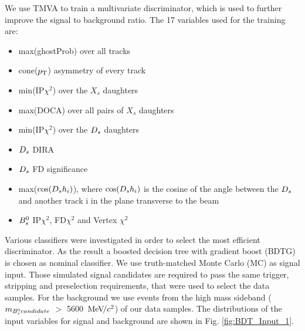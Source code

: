 We use TMVA \cite{Hocker:2007ht} to train a multivariate discriminator, which is used to further improve the signal to background ratio. 
The 17 variables used for the training are:

\begin{itemize} 

\item max(ghostProb) over all tracks

\item cone($\mbox{$p_{\mathrm{ T}}$}$) asymmetry of every track

\item min(IP$\chi^{2}$) over the $X_{s}$ daughters

\item max(DOCA) over all pairs of $X_{s}$ daughters

\item min(IP$\chi^{2}$) over the ${{D}_{s}}$ daughters

\item ${{D}_{s}}$ DIRA

\item ${{D}_{s}}$ FD significance

\item max($\cos({{D}_{s}} h_{i})$), where $\cos({{D}_{s}} h_{i})$ is the cosine of the angle between the ${{D}_{s}}$ and another track i in the plane transverse to the beam

\item ${{B}^0_{s}}$ IP$\chi^{2}$, FD$\chi^{2}$ and Vertex $\chi^{2}$

\end{itemize}

Various classifiers were investigated in order to select the most efficient discriminator. As the result a boosted decision tree with gradient boost (BDTG) is chosen as nominal classifier. 
We use truth-matched Monte Carlo (MC)
as signal input. 
Those simulated signal candidates are required to pass the same trigger, stripping and preselection requirements, that were used to select the data samples. 
For the background we use events from the high mass sideband ($m_{{{B}^0_{s}} candidate}$ $>$ 5600 ${\mathrm{\,Me\kern -0.1em V\!/}c^2}$) of our data samples. \newline
The distributions of the input variables for signal and background are shown in Fig. \ref{fig:BDT_Input_1}. 

